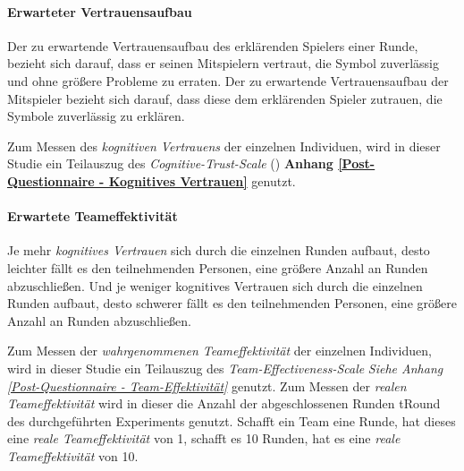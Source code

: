 \documentclass[a4paper,11pt]{article}%
\renewcommand{\\}{\vspace*{0.5\baselineskip} \newline}
\begin{document}
\paragraph{Erwarteter Vertrauensaufbau}
Der zu erwartende Vertrauensaufbau des erklärenden Spielers einer Runde, bezieht sich darauf, dass er seinen Mitspielern vertraut, die Symbol zuverlässig und ohne größere Probleme zu erraten. Der zu erwartende Vertrauensaufbau der Mitspieler bezieht sich darauf, dass diese dem erklärenden Spieler zutrauen, die Symbole zuverlässig zu erklären.

Zum Messen des \textit{kognitiven Vertrauens} der einzelnen Individuen, wird in dieser Studie ein Teilauszug des \textit{Cognitive-Trust-Scale} (\citep[p.37]{mcallister1995affect}) \textbf{Anhang \ref{Post-Questionnaire - Kognitives Vertrauen}} genutzt.

\paragraph{Erwartete Teameffektivität}
Je mehr \textit{kognitives Vertrauen} sich durch die einzelnen Runden aufbaut, desto leichter fällt es den teilnehmenden Personen, eine größere Anzahl an Runden abzuschließen. Und je weniger kognitives Vertrauen sich durch die einzelnen Runden aufbaut, desto schwerer fällt es den teilnehmenden Personen, eine größere Anzahl an Runden abzuschließen.

Zum Messen der \textit{wahrgenommenen Teameffektivität} der einzelnen Individuen, wird in dieser Studie ein Teilauszug des \textit{Team-Effectiveness-Scale} \textit{Siehe Anhang \ref{Post-Questionnaire - Team-Effektivität}} \citep[p.469]{gibson2003team} genutzt. 
Zum Messen der \textit{realen Teameffektivität} wird in dieser die Anzahl der abgeschlossenen Runden \ac{tRound} des durchgeführten Experiments genutzt. Schafft ein Team eine Runde, hat dieses eine \textit{reale Teameffektivität} von 1, schafft es 10 Runden, hat es eine \textit{reale Teameffektivität} von 10.

\newpage
\end{document}
